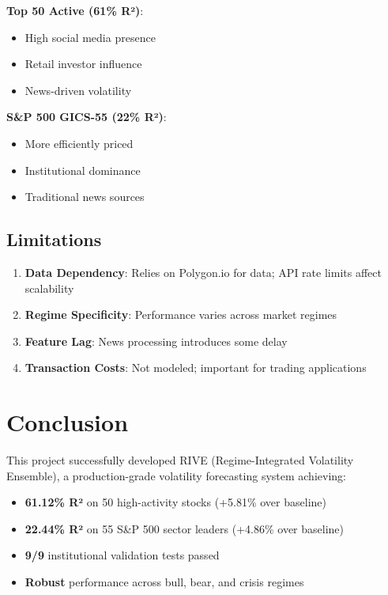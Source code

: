 \documentclass[12pt,a4paper]{article}
\begin{document}
\textbf{Top 50 Active (61\% R²)}:
\begin{itemize}
    \item High social media presence
    \item Retail investor influence
    \item News-driven volatility
\end{itemize}

\textbf{S\&P 500 GICS-55 (22\% R²)}:
\begin{itemize}
    \item More efficiently priced
    \item Institutional dominance
    \item Traditional news sources
\end{itemize}

\subsection{Limitations}

\begin{enumerate}
    \item \textbf{Data Dependency}: Relies on Polygon.io for data; API rate limits affect scalability
    \item \textbf{Regime Specificity}: Performance varies across market regimes
    \item \textbf{Feature Lag}: News processing introduces some delay
    \item \textbf{Transaction Costs}: Not modeled; important for trading applications
\end{enumerate}

\section{Conclusion}

This project successfully developed RIVE (Regime-Integrated Volatility Ensemble), a production-grade volatility forecasting system achieving:

\begin{itemize}
    \item \textbf{61.12\% R²} on 50 high-activity stocks (+5.81\% over baseline)
    \item \textbf{22.44\% R²} on 55 S\&P 500 sector leaders (+4.86\% over baseline)
    \item \textbf{9/9} institutional validation tests passed
    \item \textbf{Robust} performance across bull, bear, and crisis regimes
\end{itemize}
\end{document}
